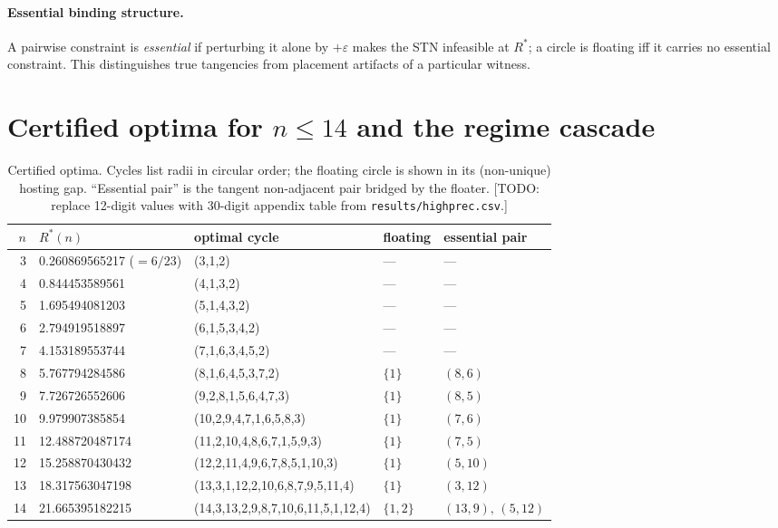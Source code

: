 \documentclass[11pt]{article}
\theoremstyle{definition}
\theoremstyle{remark}
\begin{document}
\paragraph{Essential binding structure.} A pairwise constraint is \emph{essential} if perturbing it alone by $+\varepsilon$ makes the STN infeasible at $R^\ast$; a circle is floating iff it carries no essential constraint. This distinguishes true tangencies from placement artifacts of a particular witness.

\section{Certified optima for $n\le 14$ and the regime cascade}\label{sec:results}

\begin{table}[ht]\centering
\caption{Certified optima. Cycles list radii in circular order; the floating circle is shown in its (non-unique) hosting gap. ``Essential pair'' is the tangent non-adjacent pair bridged by the floater. [TODO: replace 12-digit values with 30-digit appendix table from \texttt{results/highprec.csv}.]}
\label{tab:main}
\small
\begin{tabular}{rllll}
\toprule
$n$ & $R^\ast(n)$ & optimal cycle & floating & essential pair \\
\midrule
3 & 0.260869565217 ($=6/23$) & (3,1,2) & --- & --- \\
4 & 0.844453589561 & (4,1,3,2) & --- & --- \\
5 & 1.695494081203 & (5,1,4,3,2) & --- & --- \\
6 & 2.794919518897 & (6,1,5,3,4,2) & --- & --- \\
7 & 4.153189553744 & (7,1,6,3,4,5,2) & --- & --- \\
8 & 5.767794284586 & (8,1,6,4,5,3,7,2) & $\{1\}$ & $(8,6)$ \\
9 & 7.726726552606 & (9,2,8,1,5,6,4,7,3) & $\{1\}$ & $(8,5)$ \\
10 & 9.979907385854 & (10,2,9,4,7,1,6,5,8,3) & $\{1\}$ & $(7,6)$ \\
11 & 12.488720487174 & (11,2,10,4,8,6,7,1,5,9,3) & $\{1\}$ & $(7,5)$ \\
12 & 15.258870430432 & (12,2,11,4,9,6,7,8,5,1,10,3) & $\{1\}$ & $(5,10)$ \\
13 & 18.317563047198 & (13,3,1,12,2,10,6,8,7,9,5,11,4) & $\{1\}$ & $(3,12)$ \\
14 & 21.665395182215 & (14,3,13,2,9,8,7,10,6,11,5,1,12,4) & $\{1,2\}$ & $(13,9),\,(5,12)$ \\
\bottomrule
\end{tabular}
\end{table}
\end{document}
